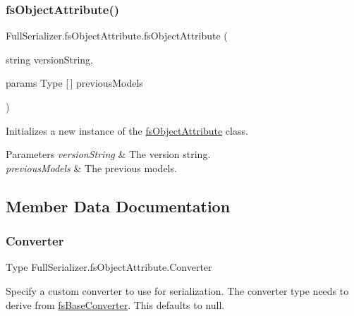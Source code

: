 \subsubsection{\texorpdfstring{fs\+Object\+Attribute()}{fsObjectAttribute()}\hspace{0.1cm}{\footnotesize\ttfamily [2/2]}}
{\footnotesize\ttfamily Full\+Serializer.\+fs\+Object\+Attribute.\+fs\+Object\+Attribute (\begin{DoxyParamCaption}\item[{string}]{version\+String,  }\item[{params Type \mbox{[}$\,$\mbox{]}}]{previous\+Models }\end{DoxyParamCaption})\hspace{0.3cm}{\ttfamily [inline]}}



Initializes a new instance of the \hyperlink{class_full_serializer_1_1fs_object_attribute}{fs\+Object\+Attribute} class. 


\begin{DoxyParams}{Parameters}
{\em version\+String} & The version string.\\
\hline
{\em previous\+Models} & The previous models.\\
\hline
\end{DoxyParams}


\subsection{Member Data Documentation}
\mbox{\label{class_full_serializer_1_1fs_object_attribute_abe3f1e8c04164f6d951c70c15870df71}} 
\subsubsection{\texorpdfstring{Converter}{Converter}}
{\footnotesize\ttfamily Type Full\+Serializer.\+fs\+Object\+Attribute.\+Converter}



Specify a custom converter to use for serialization. The converter type needs to derive from \hyperlink{class_full_serializer_1_1fs_base_converter}{fs\+Base\+Converter}. This defaults to null. 

